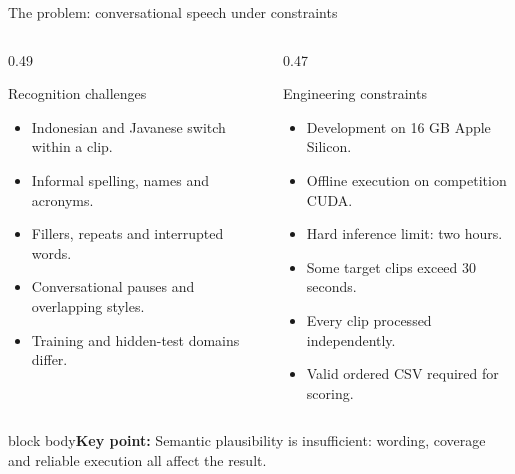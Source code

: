 \documentclass[aspectratio=169,11pt]{beamer}
\newcommand{\takeaway}[1]{\vfill\begin{beamercolorbox}[sep=2mm,wd=\linewidth]{block body}\small\textbf{Key point:} #1\end{beamercolorbox}}
\begin{document}
\begin{frame}{The problem: conversational speech under constraints}
\begin{columns}[T]
\begin{column}{0.49\textwidth}
\begin{block}{Recognition challenges}
\begin{itemize}\item Indonesian and Javanese switch within a clip.
\item Informal spelling, names and acronyms.
\item Fillers, repeats and interrupted words.
\item Conversational pauses and overlapping styles.
\item Training and hidden-test domains differ.
\end{itemize}
\end{block}
\end{column}
\begin{column}{0.47\textwidth}
\begin{block}{Engineering constraints}
\begin{itemize}\item Development on 16 GB Apple Silicon.
\item Offline execution on competition CUDA.
\item Hard inference limit: two hours.
\item Some target clips exceed 30 seconds.
\item Every clip processed independently.
\item Valid ordered CSV required for scoring.
\end{itemize}
\end{block}
\end{column}
\end{columns}
\takeaway{Semantic plausibility is insufficient: wording, coverage and reliable execution all affect the result.}
\end{frame}
\end{document}
